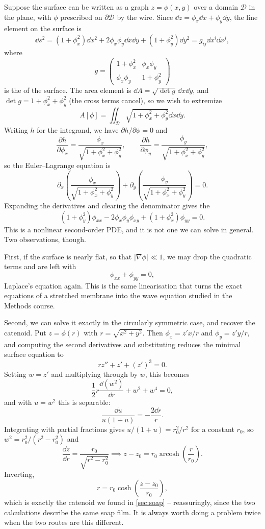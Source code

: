 \documentclass[a4paper]{scrartcl}
\begin{document}
Suppose the surface can be written as a graph $z = \phi(x, y)$ over a domain $\mathcal{D}$ in the plane, with $\phi$ prescribed on $\partial \mathcal D$ by the wire. Since $\dd z = \phi_x \dd x + \phi_y \dd y$, the line element on the surface is
$$
\dd s^2 = \left(1 + \phi_x^2\right)\dd x^2 + 2\phi_x\phi_y \dd x \dd y + \left(1 + \phi_y^2\right)\dd y^2 = g_{ij}\dd x^i \dd x^j,
$$
where
$$
g = \begin{pmatrix} 1 + \phi_x^2 & \phi_x\phi_y \\ \phi_x\phi_y & 1 + \phi_y^2\end{pmatrix}
$$
is the  of the surface. The area element is $\dd A = \sqrt{\det g}\,\dd x\dd y$, and $\det g = 1 + \phi_x^2 + \phi_y^2$ (the cross terms cancel), so we wish to extremize
$$
A[\phi] = \iint_{\mathcal D}\sqrt{1 + \phi_x^2 + \phi_y^2}\dd x \dd y.
$$
Writing $h$ for the integrand, we have $\partial h/\partial \phi = 0$ and
$$
\frac{\partial h}{\partial \phi_x} = \frac{\phi_x}{\sqrt{1 + \phi_x^2 + \phi_y^2}}, \qquad \frac{\partial h}{\partial \phi_y} = \frac{\phi_y}{\sqrt{1 + \phi_x^2 + \phi_y^2}},
$$
so the Euler--Lagrange equation is
$$
\partial_x\left(\frac{\phi_x}{\sqrt{1 + \phi_x^2 + \phi_y^2}}\right) + \partial_y\left(\frac{\phi_y}{\sqrt{1 + \phi_x^2 + \phi_y^2}}\right) = 0.
$$
Expanding the derivatives and clearing the denominator gives the 
$$
\left(1 + \phi_y^2\right)\phi_{xx} - 2\phi_x\phi_y\phi_{xy} + \left(1 + \phi_x^2\right)\phi_{yy} = 0.
$$
This is a nonlinear second-order PDE, and it is not one we can solve in general. Two observations, though.

First, if the surface is nearly flat, so that $|\nabla\phi| \ll 1$, we may drop the quadratic terms and are left with
$$
\phi_{xx} + \phi_{yy} = 0,
$$
Laplace's equation again. This is the same linearisation that turns the exact equations of a stretched membrane into the wave equation studied in the Methods course.

Second, we can solve it exactly in the circularly symmetric case, and recover the catenoid. Put $z = \phi(r)$ with $r = \sqrt{x^2 + y^2}$. Then $\phi_x = z' x/r$ and $\phi_y = z' y/r$, and computing the second derivatives and substituting reduces the minimal surface equation to
$$
r z'' + z' + (z')^3 = 0.
$$
Setting $w = z'$ and multiplying through by $w$, this becomes
$$
\frac{1}{2}r\frac{\dd (w^2)}{\dd r} + w^2 + w^4 = 0,
$$
and with $u = w^2$ this is separable:
$$
\frac{\dd u}{u(1 + u)} = -\frac{2\dd r}{r}.
$$
Integrating with partial fractions gives $u/(1+u) = r_0^2/r^2$ for a constant $r_0$, so $w^2 = r_0^2/(r^2 - r_0^2)$ and
$$
\frac{\dd z}{\dd r} = \frac{r_0}{\sqrt{r^2 - r_0^2}} \implies z - z_0 = r_0 \operatorname{arcosh}\left(\frac{r}{r_0}\right).
$$
Inverting,
$$
r = r_0\cosh\left(\frac{z - z_0}{r_0}\right),
$$
which is exactly the catenoid we found in \autoref{sec:soap} -- reassuringly, since the two calculations describe the same soap film. It is always worth doing a problem twice when the two routes are this different.
\end{document}
